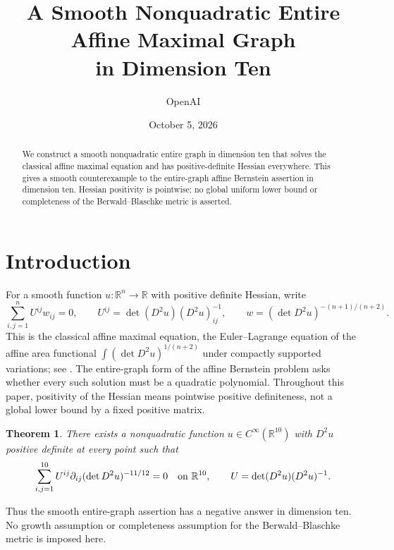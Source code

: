 \documentclass[11pt]{article}
\title{A Smooth Nonquadratic Entire Affine Maximal Graph\\ in Dimension Ten}
\author{OpenAI}
\date{October 5, 2026}
\newcommand{\R}{\mathbb R}
\newtheorem{theorem}{Theorem}[section]
\theoremstyle{remark}
\begin{document}
\maketitle

\begin{abstract}
We construct a smooth nonquadratic entire graph in dimension ten that
solves the classical affine maximal equation and has positive-definite
Hessian everywhere. This gives a smooth counterexample to the
entire-graph affine Bernstein assertion in dimension ten. Hessian
positivity is pointwise; no global uniform lower bound or completeness
of the Berwald--Blaschke metric is asserted.
\end{abstract}

\section{Introduction}
For a smooth function $u:\R^n\to\R$ with positive definite Hessian,
write
\begin{equation}\label{eq:affine}
 \sum_{i,j=1}^n U^{ij}w_{ij}=0,\qquad
 U^{ij}=\det(D^2u)(D^2u)^{-1}_{ij},\qquad
 w=(\det D^2u)^{-(n+1)/(n+2)}.
\end{equation}
This is the classical affine maximal equation, the Euler--Lagrange
equation of the affine area functional
$\int (\det D^2u)^{1/(n+2)}$ under compactly supported variations;
see \cite{TrudingerWang2000}.  The entire-graph form of the affine
Bernstein problem asks whether every such solution must be a
quadratic polynomial.  Throughout this paper, positivity of the
Hessian means pointwise positive definiteness, not a global lower
bound by a fixed positive matrix.

\begin{theorem}\label{thm:main}
There exists a nonquadratic function $u\in C^\infty(\R^{10})$
with $D^2u$ positive definite at every point such that
\[
 \sum_{i,j=1}^{10}U^{ij}\partial_{ij}
       (\det D^2u)^{-11/12}=0
 \quad\hbox{on }\R^{10},
 \qquad U=\det(D^2u)(D^2u)^{-1}.
\]
\end{theorem}

Thus the smooth entire-graph assertion has a negative answer in
dimension ten.  No growth assumption or completeness assumption for
the Berwald--Blaschke metric is imposed here.
\end{document}
